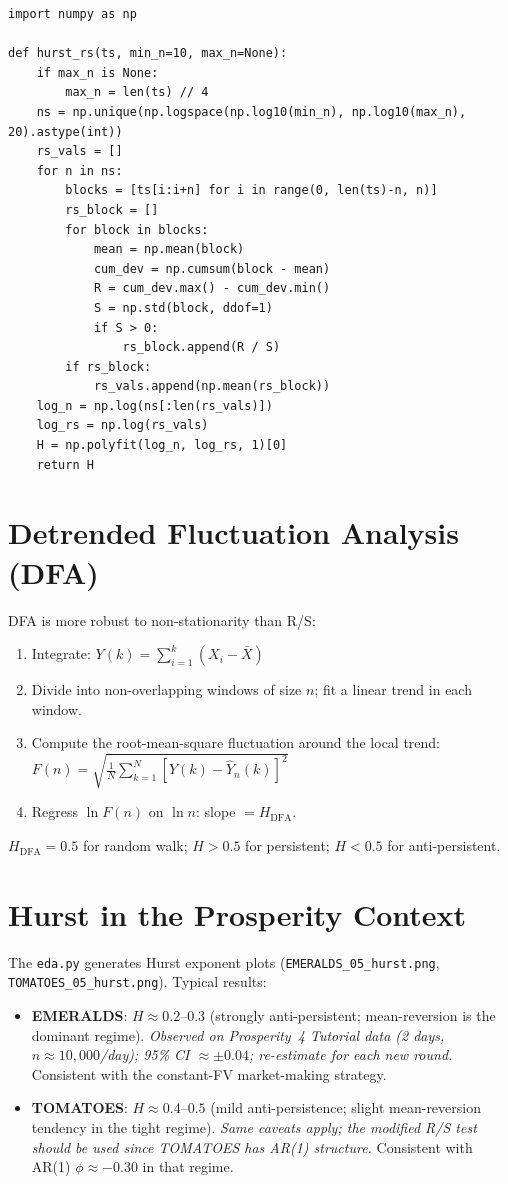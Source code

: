\documentclass[12pt,a4paper,openany]{report}
\theoremstyle{definition}
\begin{document}
\begin{lstlisting}[caption={R/S Hurst exponent estimation}]
import numpy as np

def hurst_rs(ts, min_n=10, max_n=None):
    if max_n is None:
        max_n = len(ts) // 4
    ns = np.unique(np.logspace(np.log10(min_n), np.log10(max_n), 20).astype(int))
    rs_vals = []
    for n in ns:
        blocks = [ts[i:i+n] for i in range(0, len(ts)-n, n)]
        rs_block = []
        for block in blocks:
            mean = np.mean(block)
            cum_dev = np.cumsum(block - mean)
            R = cum_dev.max() - cum_dev.min()
            S = np.std(block, ddof=1)
            if S > 0:
                rs_block.append(R / S)
        if rs_block:
            rs_vals.append(np.mean(rs_block))
    log_n = np.log(ns[:len(rs_vals)])
    log_rs = np.log(rs_vals)
    H = np.polyfit(log_n, log_rs, 1)[0]
    return H
\end{lstlisting}

\section{Detrended Fluctuation Analysis (DFA)}

DFA is more robust to non-stationarity than R/S:
\begin{enumerate}[label=\arabic*.]
  \item Integrate: $Y(k) = \sum_{i=1}^k (X_i - \bar{X})$
  \item Divide into non-overlapping windows of size $n$; fit a linear trend in each window.
  \item Compute the root-mean-square fluctuation around the local trend: $F(n) = \sqrt{\frac{1}{N}\sum_{k=1}^N [Y(k) - \hat{Y}_n(k)]^2}$
  \item Regress $\ln F(n)$ on $\ln n$: slope $= H_{\text{DFA}}$.
\end{enumerate}

$H_{\text{DFA}} = 0.5$ for random walk; $H > 0.5$ for persistent; $H < 0.5$ for anti-persistent.

\section{Hurst in the Prosperity Context}

The \texttt{eda.py} generates Hurst exponent plots (\texttt{EMERALDS\_05\_hurst.png}, \texttt{TOMATOES\_05\_hurst.png}). Typical results:
\begin{itemize}
  \item \textbf{EMERALDS}: $H \approx 0.2$--$0.3$ (strongly anti-persistent; mean-reversion is the dominant regime). \emph{Observed on Prosperity~4 Tutorial data (2 days, $n \approx 10{,}000$/day); 95\% CI $\approx \pm 0.04$; re-estimate for each new round.} Consistent with the constant-FV market-making strategy.
  \item \textbf{TOMATOES}: $H \approx 0.4$--$0.5$ (mild anti-persistence; slight mean-reversion tendency in the tight regime). \emph{Same caveats apply; the modified R/S test should be used since TOMATOES has AR(1) structure.} Consistent with AR(1) $\phi \approx -0.30$ in that regime.
\end{itemize}
\end{document}
